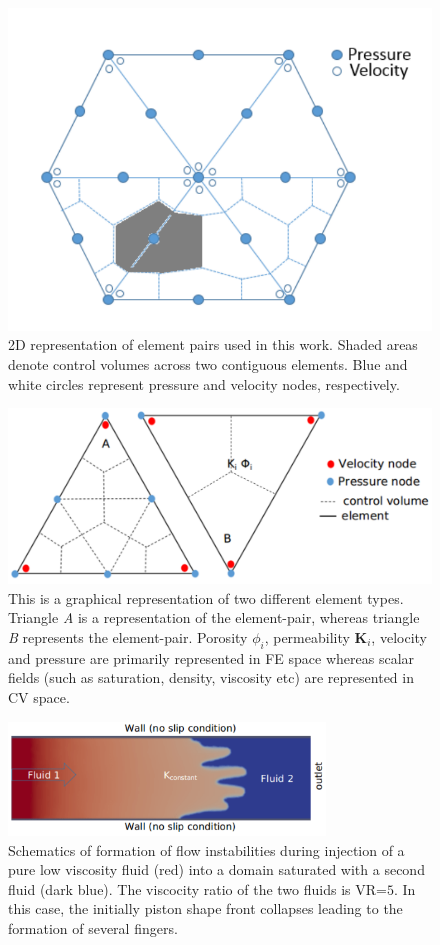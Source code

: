 
\begin{figure}[h]
\centering
\vbox{\includegraphics[width=.5\textwidth]{./Pics/P1DGP2.pdf}}
\caption{2D representation of  element pairs used in this work. Shaded areas denote control volumes across two contiguous elements. Blue and white circles represent pressure and velocity nodes, respectively.} 
\label{fig:fem_cv}
\end{figure}
\clearpage


\begin{figure}[h]
\centering
\vbox{\includegraphics[width=.75\textwidth]{./Pics/element_n_1.pdf}}
\caption{This is a graphical representation of two different element types. Triangle {\it A} is a representation of the  element-pair, whereas triangle {\it B} represents the  element-pair. Porosity $\phi_{i}$, permeability {\bf K}$_{i}$, velocity and pressure are primarily represented in FE space whereas scalar fields (such as saturation, density, viscosity etc) are represented in CV space.}
\label{fig:fem_elem}
\end{figure}
\clearpage

\begin{figure}[h]
\centering
\vbox{\includegraphics[width=0.75\textwidth]{./Pics/phase_vol_frac_uni_perm_1.pdf}}
\caption{Schematics of formation of flow instabilities during injection of a pure low viscosity fluid (red) into a domain saturated with a second fluid (dark blue). The viscocity ratio of the two fluids is VR=$5$. In this case, the initially piston shape front collapses leading to the formation of several fingers.}
\label{fig:simple_case}
\end{figure}
\clearpage


